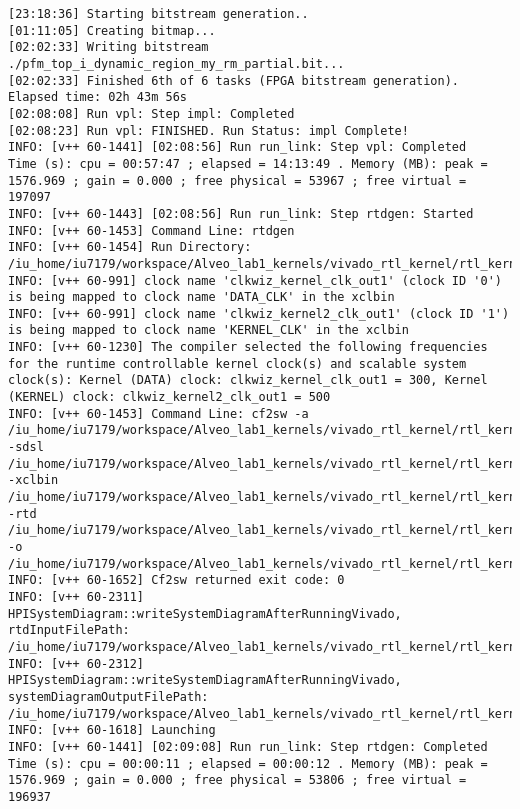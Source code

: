 \begin{lstlisting}[label=func,breaklines=true,breakatwhitespace=false,caption=СОДЕРЖИМОЕ LOG-ФАЙЛА.]
[23:18:36] Starting bitstream generation..
[01:11:05] Creating bitmap...
[02:02:33] Writing bitstream ./pfm_top_i_dynamic_region_my_rm_partial.bit...
[02:02:33] Finished 6th of 6 tasks (FPGA bitstream generation). Elapsed time: 02h 43m 56s 
[02:08:08] Run vpl: Step impl: Completed
[02:08:23] Run vpl: FINISHED. Run Status: impl Complete!
INFO: [v++ 60-1441] [02:08:56] Run run_link: Step vpl: Completed
Time (s): cpu = 00:57:47 ; elapsed = 14:13:49 . Memory (MB): peak = 1576.969 ; gain = 0.000 ; free physical = 53967 ; free virtual = 197097
INFO: [v++ 60-1443] [02:08:56] Run run_link: Step rtdgen: Started
INFO: [v++ 60-1453] Command Line: rtdgen
INFO: [v++ 60-1454] Run Directory: /iu_home/iu7179/workspace/Alveo_lab1_kernels/vivado_rtl_kernel/rtl_kernel_wizard_0_ex/exports/_x/link/run_link
INFO: [v++ 60-991] clock name 'clkwiz_kernel_clk_out1' (clock ID '0') is being mapped to clock name 'DATA_CLK' in the xclbin
INFO: [v++ 60-991] clock name 'clkwiz_kernel2_clk_out1' (clock ID '1') is being mapped to clock name 'KERNEL_CLK' in the xclbin
INFO: [v++ 60-1230] The compiler selected the following frequencies for the runtime controllable kernel clock(s) and scalable system clock(s): Kernel (DATA) clock: clkwiz_kernel_clk_out1 = 300, Kernel (KERNEL) clock: clkwiz_kernel2_clk_out1 = 500
INFO: [v++ 60-1453] Command Line: cf2sw -a /iu_home/iu7179/workspace/Alveo_lab1_kernels/vivado_rtl_kernel/rtl_kernel_wizard_0_ex/exports/_x/link/int/address_map.xml -sdsl /iu_home/iu7179/workspace/Alveo_lab1_kernels/vivado_rtl_kernel/rtl_kernel_wizard_0_ex/exports/_x/link/int/sdsl.dat -xclbin /iu_home/iu7179/workspace/Alveo_lab1_kernels/vivado_rtl_kernel/rtl_kernel_wizard_0_ex/exports/_x/link/int/xclbin_orig.xml -rtd /iu_home/iu7179/workspace/Alveo_lab1_kernels/vivado_rtl_kernel/rtl_kernel_wizard_0_ex/exports/_x/link/int/vinc.rtd -o /iu_home/iu7179/workspace/Alveo_lab1_kernels/vivado_rtl_kernel/rtl_kernel_wizard_0_ex/exports/_x/link/int/vinc.xml
INFO: [v++ 60-1652] Cf2sw returned exit code: 0
INFO: [v++ 60-2311] HPISystemDiagram::writeSystemDiagramAfterRunningVivado, rtdInputFilePath: /iu_home/iu7179/workspace/Alveo_lab1_kernels/vivado_rtl_kernel/rtl_kernel_wizard_0_ex/exports/_x/link/int/vinc.rtd
INFO: [v++ 60-2312] HPISystemDiagram::writeSystemDiagramAfterRunningVivado, systemDiagramOutputFilePath: /iu_home/iu7179/workspace/Alveo_lab1_kernels/vivado_rtl_kernel/rtl_kernel_wizard_0_ex/exports/_x/link/int/systemDiagramModelSlrBaseAddress.json
INFO: [v++ 60-1618] Launching 
INFO: [v++ 60-1441] [02:09:08] Run run_link: Step rtdgen: Completed
Time (s): cpu = 00:00:11 ; elapsed = 00:00:12 . Memory (MB): peak = 1576.969 ; gain = 0.000 ; free physical = 53806 ; free virtual = 196937

\end{lstlisting}
